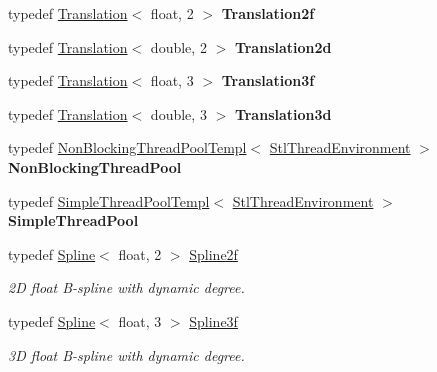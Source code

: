 \begin{DoxyCompactItemize}
\item 
typedef \hyperlink{group___geometry___module_class_eigen_1_1_translation}{Translation}$<$ float, 2 $>$ {\bfseries Translation2f}
\item 
typedef \hyperlink{group___geometry___module_class_eigen_1_1_translation}{Translation}$<$ double, 2 $>$ {\bfseries Translation2d}
\item 
typedef \hyperlink{group___geometry___module_class_eigen_1_1_translation}{Translation}$<$ float, 3 $>$ {\bfseries Translation3f}
\item 
typedef \hyperlink{group___geometry___module_class_eigen_1_1_translation}{Translation}$<$ double, 3 $>$ {\bfseries Translation3d}
\item 
\mbox{\label{namespace_eigen_afba14169682de77907337b3547300760}} 
typedef \hyperlink{class_eigen_1_1_non_blocking_thread_pool_templ}{Non\+Blocking\+Thread\+Pool\+Templ}$<$ \hyperlink{struct_eigen_1_1_stl_thread_environment}{Stl\+Thread\+Environment} $>$ {\bfseries Non\+Blocking\+Thread\+Pool}
\item 
\mbox{\label{namespace_eigen_a5135b7527ffd82c67a1cf861d3eff1e4}} 
typedef \hyperlink{class_eigen_1_1_simple_thread_pool_templ}{Simple\+Thread\+Pool\+Templ}$<$ \hyperlink{struct_eigen_1_1_stl_thread_environment}{Stl\+Thread\+Environment} $>$ {\bfseries Simple\+Thread\+Pool}
\item 
\mbox{\label{namespace_eigen_ab3267f52cedb0db97b9e2900f27193db}} 
typedef \hyperlink{group___splines___module_class_eigen_1_1_spline}{Spline}$<$ float, 2 $>$ \hyperlink{namespace_eigen_ab3267f52cedb0db97b9e2900f27193db}{Spline2f}
\begin{DoxyCompactList}\small\item\em 2D float B-\/spline with dynamic degree. \end{DoxyCompactList}\item 
\mbox{\label{namespace_eigen_a8df1e9c9ea06a0bcd26626f1b64d785e}} 
typedef \hyperlink{group___splines___module_class_eigen_1_1_spline}{Spline}$<$ float, 3 $>$ \hyperlink{namespace_eigen_a8df1e9c9ea06a0bcd26626f1b64d785e}{Spline3f}
\begin{DoxyCompactList}\small\item\em 3D float B-\/spline with dynamic degree. \end{DoxyCompactList}\item 

\end{DoxyCompactItemize}
